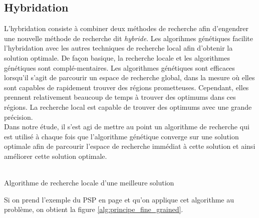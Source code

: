 \documentclass[12pt,a4paper]{article}
\begin{document}
	\subsection{Hybridation}
	L'hybridation consiste à combiner deux méthodes de recherche afin d'engendrer une nouvelle méthode de recherche dit \emph{hybride}. Les algorihmes génétiques facilite l'hybridation avec les autres techniques de recherche local afin d'obtenir la solution optimale. De façon basique, la recherche locale et les algorithmes génétiques sont complé-mentaires. Les algorithmes génétiques sont efficaces lorsqu'il s'agit de parcourir un espace de recherche global, dans la mesure où elles sont capables de rapidement trouver des régions prometteuses. Cependant, elles prennent relativement beaucoup de temps à trouver des optimums dans ces régions. La recherche local est capable de trouver des optimums avec une grande précision. \\
	\hspace*{.5cm} Dans notre étude, il s'est agi de mettre au point un algorithme de recherche qui est utilisé à chaque fois que l'algorithme génétique converge sur une solution optimale afin de parcourir l'espace de recherche immédiat à cette solution et ainsi améliorer cette solution optimale.  \\
	\\
	\begin{algorithm}[H]
 		\caption{Algorithme de recherche locale d'une meilleure solution}
 		\BlankLine
	\end{algorithm}
	\vspace*{.5cm}
	Si on prend l'exemple du PSP en page \pageref{sec:problem_description} et qu'on applique cet algorithme au problème, on obtient la figure \ref{alg:principe_fine_grained}.
	
\end{document}
